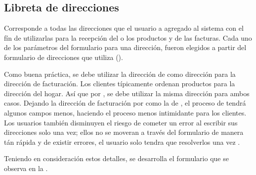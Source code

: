 	\subsection{Libreta de direcciones}\label{chapter:solucionimplementada:section:profile:subsection:book_address}

		Corresponde a todas las direcciones que el usuario a agregado al sistema con el fín de utilizarlas para la recepción del o los productos y de las facturas. Cada uno de los parámetros del formulario para una dirección, fueron elegidos a partir del formulario de direcciones que utiliza \amazonNAME ().

		Como buena práctica, se debe utilizar la dirección de \ShippingCOM como dirección  para la dirección de facturación. Los clientes típicamente ordenan productos para la dirección del hogar. Así que por , se debe utilizar la misma dirección para ambos casos\cite{online_official_smashingmagazine_fundamental_guidelines_checkout_design}.
		Dejando la dirección de facturación por  como la de \ShippingCOM, el proceso de \checkoutCOM tendrá algunos campos menos, haciendo el proceso menos intimidante para los clientes. Los usuarios también disminuyen el riesgo de cometer un error al escribir sus direcciones solo una vez; ellos no se moveran a través del formulario de manera tán rápida y de existir errores, el usuario solo tendra que resolverlos una vez \cite{online_official_smashingmagazine_fundamental_guidelines_checkout_design}.

		Teniendo en consideración estos detalles, se desarrolla el formulario que se observa en la .

